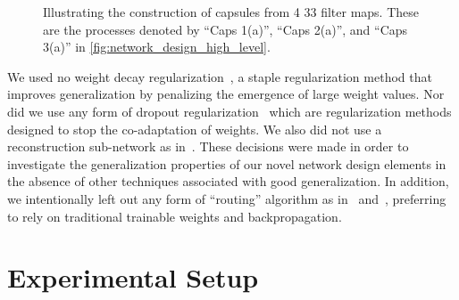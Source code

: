 \documentclass{article}
\begin{document}
\begin{figure}[!ht]
  \centering
  \hspace*{.5in}
  \caption{Illustrating the construction of capsules from 4 33 filter maps.  These are the processes denoted by ``Caps 1(a)'', ``Caps 2(a)'', and ``Caps 3(a)'' in \autoref{fig:network_design_high_level}.}\label{fig:capsule_methods}
\end{figure}

We used no weight decay regularization~\cite{Hinton1987}, a staple regularization method that improves generalization by penalizing the emergence of large weight values.  Nor did we use any form of dropout regularization~\cite{Hinton2012}\cite{Wan2013} which are regularization methods designed to stop the co-adaptation of weights.  We also did not use a reconstruction sub-network as in~\cite{Sabour2017}.  These decisions were made in order to investigate the generalization properties of our novel network design elements in the absence of other techniques associated with good generalization.  In addition, we intentionally left out any form of ``routing'' algorithm as in~\cite{Sabour2017} and~\cite{Hinton2018}, preferring to rely on traditional trainable weights and backpropagation.

\section{Experimental Setup}\label{sec:experimental_setup}
\end{document}
